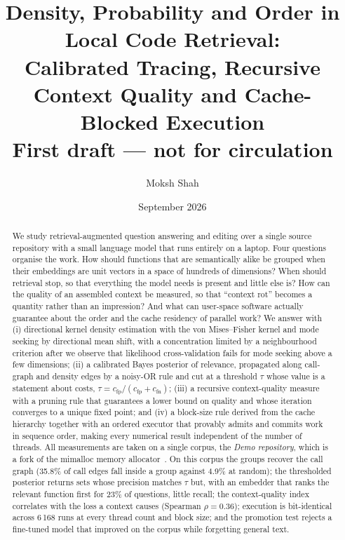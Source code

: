 \documentclass[10pt,twocolumn]{article}
\title{Density, Probability and Order in Local Code Retrieval:\\
Calibrated Tracing, Recursive Context Quality and Cache-Blocked Execution\\[4pt]
\large First draft --- not for circulation}
\author{Moksh Shah}
\date{September 2026}
\theoremstyle{definition}
\theoremstyle{remark}
\begin{document}
\maketitle

\begin{abstract}
We study retrieval-augmented question answering and editing over a single source repository with a small language model that runs entirely on a laptop.
Four questions organise the work.
How should functions that are semantically alike be grouped when their embeddings are unit vectors in a space of hundreds of dimensions?
When should retrieval stop, so that everything the model needs is present and little else is?
How can the quality of an assembled context be measured, so that ``context rot'' becomes a quantity rather than an impression?
And what can user-space software actually guarantee about the order and the cache residency of parallel work?
We answer with (i) directional kernel density estimation with the von Mises--Fisher kernel and mode seeking by directional mean shift, with a concentration limited by a neighbourhood criterion after we observe that likelihood cross-validation fails for mode seeking above a few dimensions;
(ii) a calibrated Bayes posterior of relevance, propagated along call-graph and density edges by a noisy-OR rule and cut at a threshold $\tau$ whose value is a statement about costs, $\tau=c_{\mathrm{fp}}/(c_{\mathrm{fp}}+c_{\mathrm{fn}})$;
(iii) a recursive context-quality measure with a pruning rule that guarantees a lower bound on quality and whose iteration converges to a unique fixed point;
and (iv) a block-size rule derived from the cache hierarchy together with an ordered executor that provably admits and commits work in sequence order, making every numerical result independent of the number of threads.
All measurements are taken on a single corpus, the \emph{Demo repository}, which is a fork of the mimalloc memory allocator~\cite{mimalloc}.
On this corpus the groups recover the call graph (35.8\% of call edges fall inside a group against 4.9\% at random); the thresholded posterior returns sets whose precision matches $\tau$ but, with an embedder that ranks the relevant function first for 23\% of questions, little recall; the context-quality index correlates with the loss a context causes (Spearman $\rho=0.36$); execution is bit-identical across 6\,168 runs at every thread count and block size; and the promotion test rejects a fine-tuned model that improved on the corpus while forgetting general text.
\end{abstract}
\end{document}
